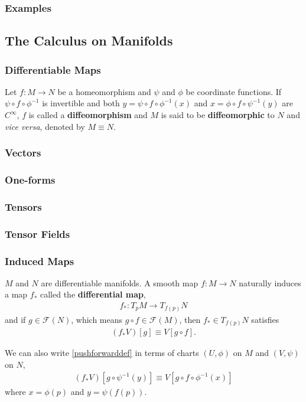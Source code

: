 \documentclass[10pt]{article}
\begin{document}
\subsubsection{Examples}
\subsection{The Calculus on Manifolds}
\subsubsection{Differentiable Maps}
\begin{definition}[Diffeomorphism]
    Let $f:M\to N$ be a homeomorphism and $\psi$ and $\phi$ be coordinate functions.
    If $\psi\circ f\circ \phi^{-1}$ is invertible and both $y=\psi\circ f\circ \phi^{-1}(x)$ and $x=\phi\circ f\circ \psi^{-1}(y)$ are $C^\infty$, $f$ is called a \textbf{diffeomorphism} and $M$ is said to be \textbf{diffeomorphic} to $N$ and \textit{vice versa}, denoted by $M\equiv N$.
\end{definition}
\subsubsection{Vectors}
\subsubsection{One-forms}
\subsubsection{Tensors}
\subsubsection{Tensor Fields}
\subsubsection{Induced Maps}
\begin{definition}
    $M$ and $N$ are differentiable manifolds.
    A smooth map $f:M\to N$ naturally induces a map $f_*$ called the \textbf{differential map},
    \begin{align}
        f_*:T_p M\to T_{f(p)}N
    \end{align}
    and if $g\in\mathcal{F}(N)$, which means $g\circ f\in\mathcal{F}(M)$, then $f_*\in T_{f(p)}N$ satisfies
    \begin{align}\label{pushforwarddef}
        (f_*V)[g]\equiv V[g\circ f].
    \end{align}
\end{definition}
We can also write \cref{pushforwarddef} in terms of charts $(U,\phi)$ on $M$ and $(V,\psi)$ on $N$,
\begin{align}\label{pushforwardchart}
    (f_*V)\left[g\circ\psi^{-1}(y)\right]\equiv V\left[g\circ f\circ\phi^{-1}(x)\right]
\end{align}
where $x=\phi(p)$ and $y=\psi(f(p))$.
\end{document}
